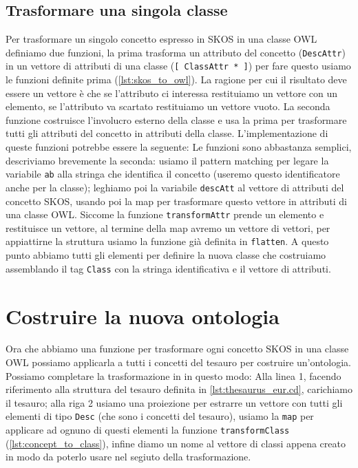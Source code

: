 \subsection{Trasformare una singola classe}
Per trasformare un singolo concetto espresso in SKOS in una classe OWL definiamo due funzioni, la prima trasforma un attributo del concetto (\verb|DescAttr|) in un vettore di attributi di una classe (\verb|[ ClassAttr * ]|) per fare questo usiamo le funzioni definite prima (\ref{lst:skos_to_owl}). La ragione per cui il risultato deve essere un vettore è che se l'attributo ci interessa restituiamo un vettore con un elemento, se l'attributo va scartato restituiamo un vettore vuoto. La seconda funzione costruisce l'involucro esterno della classe e usa la prima per trasformare tutti gli attributi del concetto in attributi della classe. L'implementazione di queste funzioni potrebbe essere la seguente:
Le funzioni sono abbastanza semplici, descriviamo brevemente la seconda: usiamo il pattern matching per legare la variabile \verb|ab| alla stringa che identifica il concetto (useremo questo identificatore anche per la classe); leghiamo poi la variabile \verb|descAtt| al vettore di attributi del concetto SKOS, usando poi la map per trasformare questo vettore in attributi di una classe OWL. Siccome la funzione \verb|transformAttr| prende un elemento e restituisce un vettore, al termine della map avremo un vettore di vettori, per appiattirne la struttura usiamo la funzione già definita in \cduce \verb|flatten|. A questo punto abbiamo tutti gli elementi per definire la nuova classe che costruiamo assemblando il tag \verb|Class| con la stringa identificativa e il vettore di attributi.
\section{Costruire la nuova ontologia}
Ora che abbiamo una funzione per trasformare ogni concetto SKOS in una classe OWL possiamo applicarla a tutti i concetti del tesauro per costruire un'ontologia. Possiamo completare la trasformazione in \cduce in questo modo:
Alla linea 1, facendo riferimento alla struttura del tesauro definita in \ref{lst:thesaurus_eur.cd}, carichiamo il tesauro; alla riga 2 usiamo una proiezione per estrarre un vettore con tutti gli elementi di tipo \verb|Desc| (che sono i concetti del tesauro), usiamo la \verb|map| per applicare ad ognuno di questi elementi la funzione \verb|transformClass| (\ref{lst:concept_to_class}), infine diamo un nome al vettore di classi appena creato in modo da poterlo usare nel segiuto della trasformazione.

